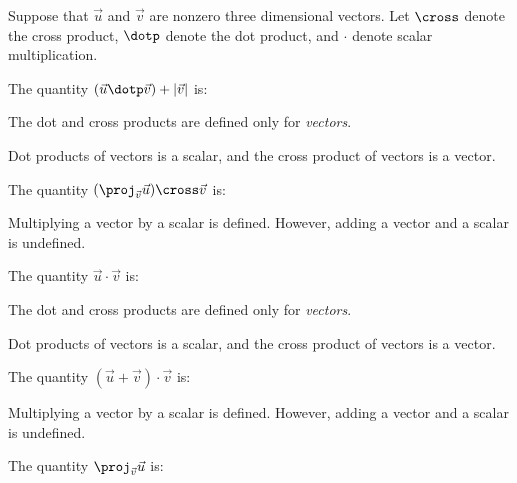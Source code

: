 \documentclass{ximera}
\author{Jim Talamo}
\begin{document}
\begin{exercise}
Suppose that $\vec u $ and $\vec v $ are nonzero three dimensional vectors.  Let $\cross$ denote the cross product, $\dotp$ denote the dot product, and $\cdot$ denote scalar multiplication.

The quantity $(\vec u \dotp \vec v)+ |\vec v|$ is:

\begin{multipleChoice}
\end{multipleChoice}


\begin{hint}
The dot and cross products are defined only for \emph{vectors}.
\end{hint}

\begin{hint}
Dot products of vectors is a scalar, and the cross product of vectors is a vector.
\end{hint}



The quantity $(\proj_{\vec v} \vec u)\cross \vec v$ is:

\begin{multipleChoice}
\end{multipleChoice}


\begin{hint}
Multiplying a vector by a scalar is defined. However, adding a vector and a scalar is undefined.
\end{hint}


The quantity $\vec u \cdot \vec v$ is:

\begin{multipleChoice}
\end{multipleChoice}

\begin{hint}
The dot and cross products are defined only for \emph{vectors}.
\end{hint}
\begin{hint}
Dot products of vectors is a scalar, and the cross product of vectors is a vector.
\end{hint}


The quantity $(\vec u + \vec v) \cdot  \vec v$ is:
\begin{multipleChoice}
\end{multipleChoice}

\begin{hint}
Multiplying a vector by a scalar is defined. However, adding a vector and a scalar is undefined.
\end{hint}


The quantity $\proj_{\vec v} \vec u$ is:

\begin{multipleChoice}
\end{multipleChoice}





\end{exercise}
\end{document}
